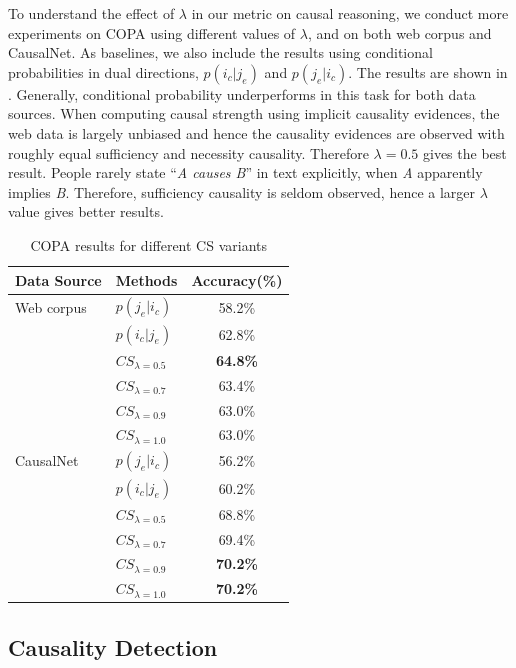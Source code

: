 To understand the effect of $\lambda$ in our metric on
causal reasoning, we conduct more experiments on COPA using different values
of $\lambda$, and on both web corpus and CausalNet. As baselines,
we also include the results using conditional probabilities in
dual directions, $p(i_c | j_e)$ and $p(j_e | i_c)$. The results
are shown in .
Generally, conditional probability underperforms in this task for
both data sources. When computing causal strength using implicit
causality evidences,
the web data is largely unbiased and hence
the causality evidences are observed with roughly
equal sufficiency and necessity causality. Therefore $\lambda=0.5$ gives the best result.
People rarely state ``\textit{A causes B}'' in text explicitly,
when \textit{A} apparently implies \textit{B}.
Therefore, sufficiency causality is seldom
observed, hence a larger $\lambda$ value gives better results.

\begin{table}[th]
\small
\centering
\caption{COPA results for different CS variants}
\label{tab:varcs}
\begin{tabular}{llc}
\hline
Data Source & Methods & Accuracy(\%) \\
\hline
Web corpus & $p(j_e | i_c)$ & 58.2\%\\
 & $p(i_c | j_e)$ & 62.8\% \\
 & $CS_{\lambda=0.5}$ & {\bf 64.8\%} \\
 & $CS_{\lambda=0.7}$ & 63.4\% \\
 & $CS_{\lambda=0.9}$ & 63.0\% \\
 & $CS_{\lambda=1.0}$ & 63.0\% \\
 \hline
CausalNet & $p(j_e | i_c)$ & 56.2\% \\
 & $p(i_c | j_e)$ & 60.2\% \\
 & $CS_{\lambda=0.5}$ & 68.8\% \\
 & $CS_{\lambda=0.7}$ & 69.4\% \\
 & $CS_{\lambda=0.9}$ & {\bf 70.2\%} \\
 & $CS_{\lambda=1.0} $ & {\bf 70.2\%} \\
\hline
\end{tabular}
\end{table}

\subsection{Causality Detection}

